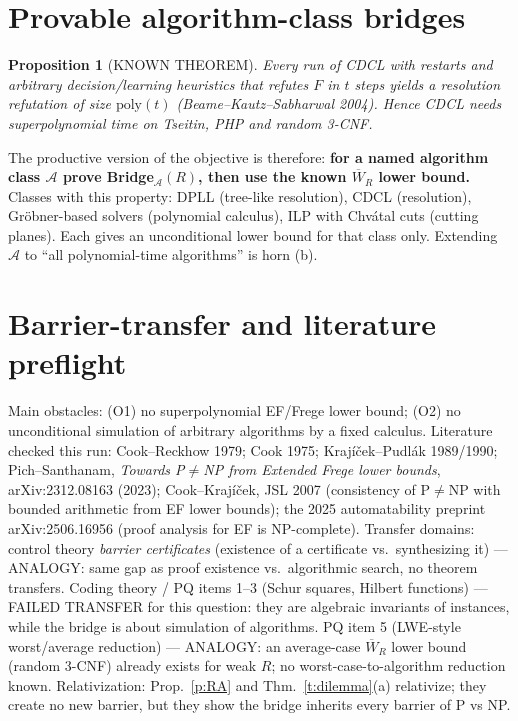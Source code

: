 \documentclass[11pt]{article}
\newtheorem{proposition}[theorem]{Proposition}
\theoremstyle{definition}
\theoremstyle{remark}
\newcommand{\WR}[1]{\overline{W}_{#1}}
\begin{document}
\section{Provable algorithm-class bridges}
\begin{proposition}[KNOWN THEOREM]\label{p:cdcl}
Every run of CDCL with restarts and arbitrary decision/learning heuristics that refutes $F$ in $t$ steps yields a resolution refutation of size $\mathrm{poly}(t)$
(Beame--Kautz--Sabharwal 2004). Hence CDCL needs superpolynomial time on Tseitin, PHP and random 3-CNF.
\end{proposition}
The productive version of the objective is therefore: \textbf{for a named algorithm class $\mathcal A$ prove Bridge$_{\mathcal A}(R)$, then use the known $\WR{R}$ lower bound.}
Classes with this property: DPLL (tree-like resolution), CDCL (resolution), Gröbner-based solvers (polynomial calculus), ILP with Chvátal cuts (cutting planes).
Each gives an unconditional lower bound for that class only. Extending $\mathcal A$ to ``all polynomial-time algorithms'' is horn (b).

\section{Barrier-transfer and literature preflight}
Main obstacles: (O1) no superpolynomial EF/Frege lower bound; (O2) no unconditional simulation of arbitrary algorithms by a fixed calculus.
Literature checked this run: Cook--Reckhow 1979; Cook 1975; Krajíček--Pudlák 1989/1990; Pich--Santhanam, \emph{Towards P$\ne$NP from Extended Frege lower bounds}, arXiv:2312.08163 (2023);
Cook--Krajíček, JSL 2007 (consistency of P$\ne$NP with bounded arithmetic from EF lower bounds); the 2025 automatability preprint arXiv:2506.16956 (proof analysis for EF is NP-complete).
Transfer domains: control theory \emph{barrier certificates} (existence of a certificate vs.\ synthesizing it) --- ANALOGY: same gap as
proof existence vs.\ algorithmic search, no theorem transfers. Coding theory / PQ items 1--3 (Schur squares, Hilbert functions) --- FAILED TRANSFER for this question:
they are algebraic invariants of instances, while the bridge is about simulation of algorithms. PQ item 5 (LWE-style worst/average reduction) --- ANALOGY: an average-case
$\WR{R}$ lower bound (random 3-CNF) already exists for weak $R$; no worst-case-to-algorithm reduction known.
Relativization: Prop.~\ref{p:RA} and Thm.~\ref{t:dilemma}(a) relativize; they create no new barrier, but they show the bridge inherits every barrier of P vs NP.
\end{document}
